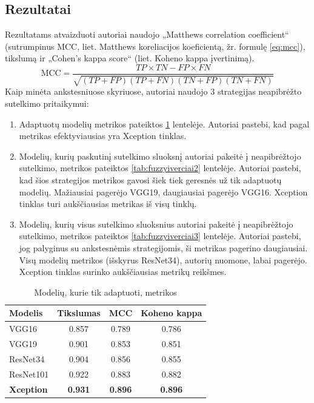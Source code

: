 \documentclass[fleqn]{VUMIFKompMagistrinis}
\begin{document}
\subsection{Rezultatai}
Rezultatams atvaizduoti autoriai naudojo „Matthews correlation coefficient“ (sutrumpinus MCC, liet. Matthews koreliacijos koeficientą, žr. formulę \ref{eq:mcc}), tikslumą ir „Cohen's kappa score“ (liet. Koheno kappa įvertinimą). \cite{HASAN2023}
\begin{equation}\label{eq:mcc}
\text{MCC} = \frac{TP \times TN - FP \times FN}{\sqrt{(TP + FP)(TP + FN)(TN + FP)(TN + FN)}}
\end{equation} Kaip minėta ankstesniuose skyriuose, autoriai naudojo 3 strategijas neapibrėžto sutelkimo pritaikymui:
\begin{enumerate}
    \item Adaptuotų modelių metrikos pateiktos \ref{tab:fuzzyiverciai1} lentelėje. Autoriai pastebi, kad pagal metrikas efektyviausias yra Xception tinklas.
    \item Modelių, kurių paskutinį sutelkimo sluoksnį autoriai pakeitė į neapibrėžtojo sutelkimo,  metrikos pateiktos \ref{tab:fuzzyiverciai2} lentelėje. Autoriai pastebi, kad šios strategijos metrikos gavosi šiek tiek geresnės už tik adaptuotų modelių. Mažiausiai pagerėjo VGG19, daugiausiai pagerėjo VGG16. Xception tinklas turi aukščiausias metrikas iš visų tinklų.
    \item Modelių, kurių visus sutelkimo sluoksnius autoriai pakeitė į neapibrėžtojo sutelkimo,  metrikos pateiktos \ref{tab:fuzzyiverciai3} lentelėje. Autoriai pastebi, jog palyginus su ankstesnėmis strategijomis, ši metrikas pagerino daugiausiai. Visų modelių metrikos (išskyrus ResNet34), autorių nuomone, labai pagerėjo. Xception tinklas surinko aukščiausias metrikų reikšmes.
\end{enumerate}\begin{table}[H]\footnotesize
  \centering
\caption{Modelių, kurie tik adaptuoti, metrikos \cite{HASAN2023}}
\begin{tabular}{|l|c|c|c|}
\hline
Modelis      & Tikslumas & MCC   & Koheno kappa \\ \hline
VGG16      & 0.857  & 0.789 &  0.786            \\
VGG19      & 0.901  & 0.853 &  0.851            \\
ResNet34   & 0.904  & 0.856 & 0.855            \\
ResNet101  & 0.922  & 0.883 & 0.882            \\
\textbf{Xception}   & \textbf{0.931}  & \textbf{0.896} & \textbf{0.896}           \\ \hline
  \end{tabular}
  \label{tab:fuzzyiverciai1}
\end{table}
\end{document}
